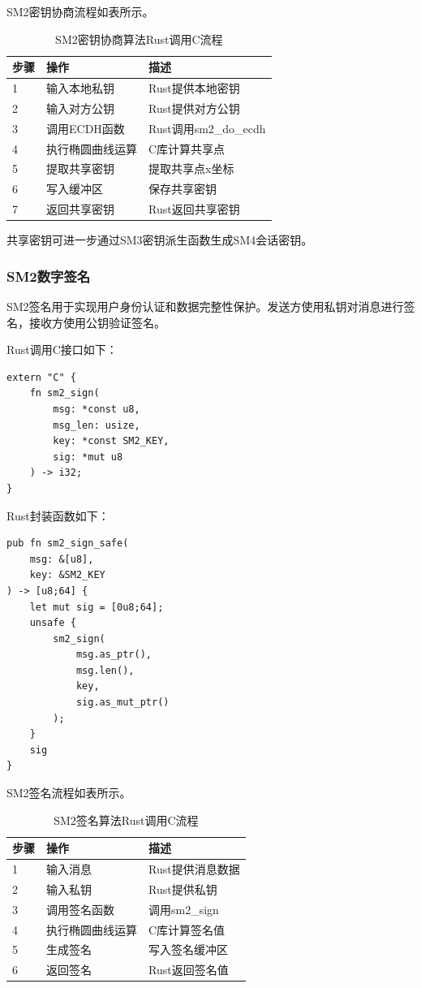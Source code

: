 SM2密钥协商流程如表所示。

\begin{table}[H]
\centering
\caption{SM2密钥协商算法Rust调用C流程}
\begin{tabular}{lll}
\toprule
步骤 & 操作 & 描述 \\
\midrule
1 & 输入本地私钥 & Rust提供本地密钥 \\
2 & 输入对方公钥 & Rust提供对方公钥 \\
3 & 调用ECDH函数 & Rust调用sm2\_do\_ecdh \\
4 & 执行椭圆曲线运算 & C库计算共享点 \\
5 & 提取共享密钥 & 提取共享点x坐标 \\
6 & 写入缓冲区 & 保存共享密钥 \\
7 & 返回共享密钥 & Rust返回共享密钥 \\
\bottomrule
\end{tabular}
\end{table}

共享密钥可进一步通过SM3密钥派生函数生成SM4会话密钥。

\subsubsection{SM2数字签名}

SM2签名用于实现用户身份认证和数据完整性保护。发送方使用私钥对消息进行签名，接收方使用公钥验证签名。

Rust调用C接口如下：

\begin{lstlisting}
extern "C" {
    fn sm2_sign(
        msg: *const u8,
        msg_len: usize,
        key: *const SM2_KEY,
        sig: *mut u8
    ) -> i32;
}
\end{lstlisting}
Rust封装函数如下：

\begin{lstlisting}
pub fn sm2_sign_safe(
    msg: &[u8],
    key: &SM2_KEY
) -> [u8;64] {
    let mut sig = [0u8;64];
    unsafe {
        sm2_sign(
            msg.as_ptr(),
            msg.len(),
            key,
            sig.as_mut_ptr()
        );
    }
    sig
}
\end{lstlisting}

SM2签名流程如表所示。

\begin{table}[H]
\centering
\caption{SM2签名算法Rust调用C流程}
\begin{tabular}{lll}
\toprule
步骤 & 操作 & 描述 \\
\midrule
1 & 输入消息 & Rust提供消息数据 \\
2 & 输入私钥 & Rust提供私钥 \\
3 & 调用签名函数 & 调用sm2\_sign \\
4 & 执行椭圆曲线运算 & C库计算签名值 \\
5 & 生成签名 & 写入签名缓冲区 \\
6 & 返回签名 & Rust返回签名值 \\
\bottomrule
\end{tabular}
\end{table}

